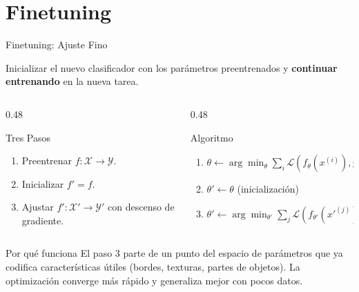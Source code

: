 \documentclass[aspectratio=169, 10pt]{beamer}
\begin{document}
\section{Finetuning}

\begin{frame}{Finetuning: Ajuste Fino}

	Inicializar el nuevo clasificador con los par\'ametros preentrenados y \textbf{continuar entrenando} en la nueva tarea.

	\vspace{0.3cm}

	\begin{columns}[T]
		\begin{column}{0.48\textwidth}
			\begin{block}{Tres Pasos}
				\begin{enumerate}
					\item Preentrenar $f : \mathcal{X} \to \mathcal{Y}$.
					\item Inicializar $f' = f$.
					\item Ajustar $f' : \mathcal{X}' \to \mathcal{Y}'$ con descenso de gradiente.
				\end{enumerate}
			\end{block}
		\end{column}

		\begin{column}{0.48\textwidth}
			\begin{block}{Algoritmo}
				\small
				\begin{enumerate}
					\item $\theta \leftarrow \arg\min_\theta \sum_{i} \mathcal{L}(f_\theta(x^{(i)}), y^{(i)})$
					\item $\theta' \leftarrow \theta$ \hfill (inicializaci\'on)
					\item $\theta' \leftarrow \arg\min_{\theta'} \sum_{j} \mathcal{L}(f_{\theta'}(x'^{(j)}), y'^{(j)})$
				\end{enumerate}
			\end{block}
		\end{column}
	\end{columns}

	\vspace{0.3cm}

	\begin{alertblock}{Por qu\'e funciona}
		El paso 3 parte de un punto del espacio de par\'ametros que ya codifica caracter\'isticas \'utiles (bordes, texturas, partes de objetos). La optimizaci\'on converge m\'as r\'apido y generaliza mejor con pocos datos.
	\end{alertblock}

\end{frame}
\end{document}

